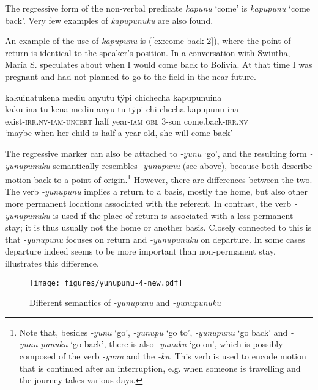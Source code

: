 The regressive form of the non-verbal predicate \textit{kapunu} ‘come’ is \textit{kapupunu} ‘come back’. Very few examples of \textit{kapupunuku} are also found.

An example of the use of \textit{kapupunu} is (\ref{ex:come-back-2}), where the point of return is identical to the speaker’s position. In a conversation with Swintha, María S. speculates about when I would come back to Bolivia. At that time I was pregnant and had not planned to go to the field in the near future.

\ea\label{ex:come-back-2}
\begingl 
\glpreamble kakuinatukena mediu anyutu tÿpi chichecha kapupunuina\\
\gla kaku-ina-tu-kena mediu anyu-tu tÿpi chi-checha kapupunu-ina\\ 
\glb exist-\textsc{irr.nv}-\textsc{iam}-\textsc{uncert} half year-\textsc{iam} \textsc{obl} 3-son come.back-\textsc{irr.nv}\\ 
\glft ‘maybe when her child is half a year old, she will come back’
\trailingcitation{[rxx-e121128s-1.054]}
\xe

The regressive marker can also be attached to \textit{-yunu} ‘go’, and the resulting form \mbox{\textit{-yunupunuku}} semantically resembles \textit{-yunupunu} (see  above), because both describe motion back to a point of origin.\footnote{Note that, besides \textit{-yunu} ‘go’, \textit{-yunupu} ‘go to’, \textit{-yunupunu} ‘go back’ and \textit{-yunu-punuku} ‘go back’, there is also \textit{-yunuku} ‘go on’, which is possibly composed of the verb \textit{-yunu} and the  \textit{-ku}. This verb is used to encode motion that is continued after an interruption, e.g. when someone is travelling and the journey takes various days.}  However, there are differences between the two. The verb \textit{-yunupunu} implies a return to a basis, mostly the home, but also other more permanent locations associated with the referent. In contrast, the verb \textit{-yunupunuku} is used if the place of return is associated with a less permanent stay; it is thus usually not the home or another basis. Closely connected to this is that \textit{-yunupunu} focuses on return and \textit{-yunupunuku} on departure. In some cases departure indeed seems to be more important than non-permanent stay.  illustrates this difference.

\begin{figure}

\texttt{[image: figures/yunupunu-4-new.pdf]}
\caption{Different semantics of \textit{-yunupunu} and \textit{-yunupunuku}}
\label{fig:yunupunu}
\end{figure}


